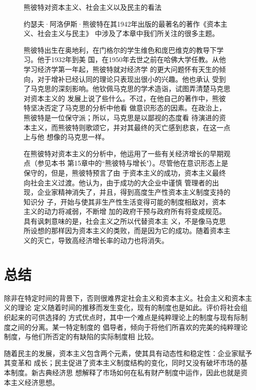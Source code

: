 \begin{figure}[ht]
\begin{mybox}{熊彼特对资本主义、社会主义以及民主的看法}
  \begin{multicols}{2}
    约瑟夫·阿洛伊斯·熊彼特在其1942年出版的最著名的著作《资本主义、社会主义与民主》
    中涉及了本章中我们所关注的很多主题。

    熊彼特出生在奥地利，在门格尔的学生维色和庞巴维克的教导下学习。他于1932年到美
    国，在1950年去世之前在哈佛大学任教。从他学习经济学第一年起，熊彼特就对经济学
    的更大问题怀有天生的倾向，对于增补已经认同的理论只表现出很小的兴趣。他也承认
    受到了马克思的深刻影响。他钦佩马克思的学术造诣，试图弄清楚马克思对资本主义的
    发展上说了些什么。不过，在他自己的著作中，熊彼特坚决否定了马克思的分析中他看
    做意识形态的因素。在政治上，熊彼特是一位保守派；所以，马克思是以鄙视的态度看
    待演进的资本主义，而熊彼特则歌颂它，并对其最终的灭亡感到悲哀，在这一点上与他
    想像的马克思一样。

    在熊彼特对资本主义的分析中，他运用了一些有关经济增长的早期观点（参见本书
    第15章中的“熊彼特与增长"）。尽管他在意识形态上是保守的，但是，熊彼特预言了由
    于资本主义的成功，资本主义最终向社会主义过渡。他认为，由于成功的大企业中谨慎
    管理者的出现，企业家精神消失了，并且，得到高度生产性资本主义制度支持的知识分
    子，开始与使其非生产性生活变得可能的制度相敌对，资本主义的动力将减弱，不断增
    加的政府干预与政府所有将变成规范。具有讽刺意味的是，社会主义之所以代替资本主
    义，不是像马克思所设想的那样因为资本主义的类败，而是因为它的成功。随着资本主
    义的灭亡，导致高经济增长率的动力也将消失。
  \end{multicols}
\end{mybox}
\end{figure}

\section{总结}

除非在特定时间的背景下，否则很难界定社会主义和资本主义。社会主义和资本主义的理论
定义随着时间的推移而发生变化，现有的制度也是如此。评价将社会组织起来的可供选择的
方式优点时，其中一个难点是纯粹理论上的制度与现有际制度之间的分离。某一特定制度的
倡导者，倾向于将他们所喜欢的完美的纯粹理论制度，与他们所否定的有缺陷的实际制度相
比较。

随着民主的发展，资本主义包含两个元素，使其具有动态性和稳定性：企业家赋予其变革和
成长；民主促进了资本主义制度结构的变化，同时又没有破坏市场的基本制度。新古典经济思
想解释了市场如何在私有财产制度中运作，因此也就是资本主义经济思想。

